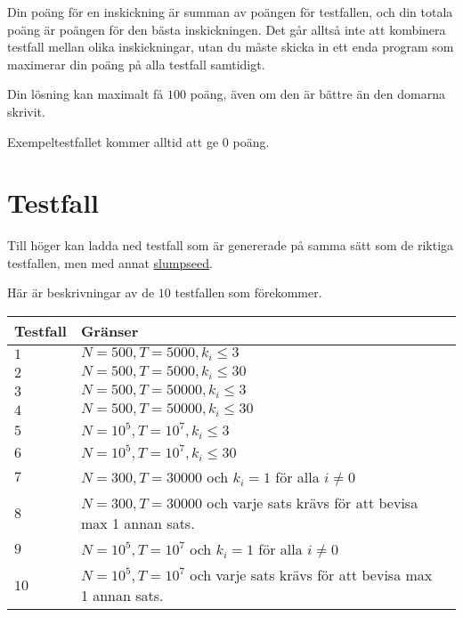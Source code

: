 Din poäng för en inskickning är summan av poängen för testfallen, och din totala poäng är poängen för den bästa inskickningen.
Det går alltså inte att kombinera testfall mellan olika inskickningar, utan du måste skicka in ett enda program som
maximerar din poäng på alla testfall samtidigt.

Din lösning kan maximalt få $100$ poäng, även om den är bättre än den domarna skrivit.

Exempeltestfallet kommer alltid att ge $0$ poäng.

\section*{Testfall}
Till höger kan ladda ned testfall som är genererade på samma sätt som de riktiga testfallen,
men med annat \href{https://en.wikipedia.org/wiki/Random_seed}{slumpseed}.

Här är beskrivningar av de $10$ testfallen som förekommer.

\noindent
\begin{tabular}{| l | l | l |}
\hline
Testfall & Gränser  \\ \hline
$1$       & $N=500,T=5000,k_i \le 3$  \\ \hline
$2$       & $N=500,T=5000,k_i \le 30$  \\ \hline
$3$       & $N=500,T=50000,k_i \le 3$  \\ \hline
$4$       & $N=500,T=50000,k_i \le 30$  \\ \hline
$5$       & $N=10^5,T=10^7,k_i \le 3$  \\ \hline
$6$       & $N=10^5,T=10^7,k_i \le 30$  \\ \hline
$7$       & $N=300,T=30000$ och $k_i=1$ för alla $i\neq0$\\ \hline
$8$       & $N=300,T=30000$ och varje sats krävs för att bevisa max 1 annan sats. \\ \hline
$9$       & $N=10^5,T=10^7$ och $k_i=1$ för alla $i\neq0$ \\ \hline
$10$      & $N=10^5,T=10^7$ och varje sats krävs för att bevisa max 1 annan sats.  \\ \hline
\end{tabular}
